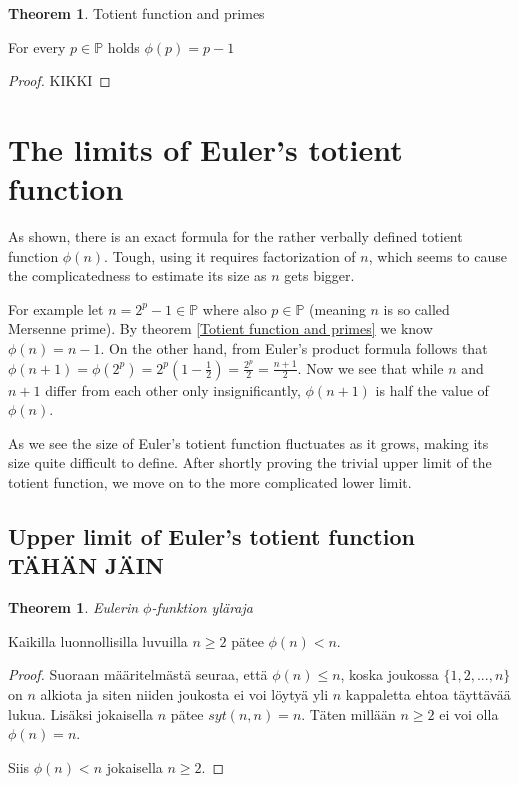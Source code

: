 \documentclass{article}
\theoremstyle{definition}
\newtheorem{theorem}[subsection]{Theorem}
\begin{document}
\begin{theorem}{Totient function and primes}

For every $p \in \mathbb{P}$ holds $\phi(p) = p-1$

\begin{proof}

KIKKI

\end{proof}

\end{theorem}

\section{The limits of Euler's totient function}

As shown, there is an exact formula for the rather verbally defined totient function $\phi(n)$. Tough, using it requires factorization of $n$, which seems to cause the complicatedness to estimate its size as $n$ gets bigger.

For example let $n = 2^p - 1 \in \mathbb{P}$ where also $p \in \mathbb{P}$ (meaning $n$ is so called Mersenne prime). By theorem \ref{Totient function and primes} we know $\phi(n) = n - 1$. On the other hand, from Euler's product formula follows that $\phi(n+1) = \phi(2^p) = 2^p(1-\frac{1}{2}) = \frac{2^p}{2} = \frac{n+1}{2}$. Now we see that while $n$ and $n+1$ differ from each other only insignificantly, $\phi(n+1)$ is half the value of $\phi(n)$.

As we see the size of Euler's totient function fluctuates as it grows, making its size quite difficult to define. After shortly proving the trivial upper limit of the totient function, we move on to the more complicated lower limit.

\subsection{Upper limit of Euler's totient function TÄHÄN JÄIN}

\begin{theorem}{\emph{Eulerin $\phi$-funktion yläraja}}

Kaikilla luonnollisilla luvuilla $n \geq 2$ pätee $\phi(n) < n$.

\begin{proof}

Suoraan määritelmästä seuraa, että $\phi(n) \leq n$, koska joukossa $\{1,2,...,n\}$ on $n$ alkiota ja siten niiden joukosta ei voi löytyä yli $n$ kappaletta ehtoa täyttävää lukua. Lisäksi jokaisella $n$ pätee $syt(n,n) = n$. Täten millään $n \geq 2$ ei voi olla $\phi(n) = n$.

Siis $\phi(n) < n$ jokaisella $n \geq 2$.

\end{proof}

\end{theorem}
\end{document}
